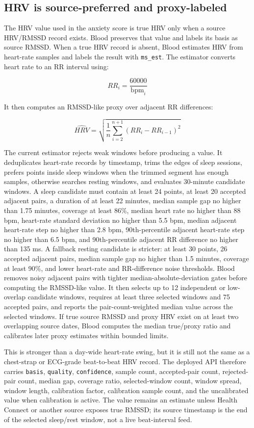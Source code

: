 \documentclass[12pt,letterpaper]{article}
\begin{document}
\subsection{HRV is source-preferred and proxy-labeled}

The HRV value used in the anxiety score is true HRV only when a source HRV/RMSSD record exists. Blood preserves that value and labels its basis as source RMSSD. When a true HRV record is absent, Blood estimates HRV from heart-rate samples and labels the result with \texttt{ms\_est}. The estimator converts heart rate to an RR interval using:

\[
RR_i = \frac{60000}{\mathrm{bpm}_i}
\]

It then computes an RMSSD-like proxy over adjacent RR differences:

\[
\widehat{HRV} = \sqrt{\frac{1}{n}\sum_{i=2}^{n+1}\left(RR_i - RR_{i-1}\right)^2}
\]

The current estimator rejects weak windows before producing a value. It deduplicates heart-rate records by timestamp, trims the edges of sleep sessions, prefers points inside sleep windows when the trimmed segment has enough samples, otherwise searches resting windows, and evaluates 30-minute candidate windows. A sleep candidate must contain at least 24 points, at least 20 accepted adjacent pairs, a duration of at least 22 minutes, median sample gap no higher than 1.75 minutes, coverage at least 86\%, median heart rate no higher than 88 bpm, heart-rate standard deviation no higher than 5.5 bpm, median adjacent heart-rate step no higher than 2.8 bpm, 90th-percentile adjacent heart-rate step no higher than 6.5 bpm, and 90th-percentile adjacent RR difference no higher than 135 ms. A fallback resting candidate is stricter: at least 30 points, 26 accepted adjacent pairs, median sample gap no higher than 1.5 minutes, coverage at least 90\%, and lower heart-rate and RR-difference noise thresholds. Blood removes noisy adjacent pairs with tighter median-absolute-deviation gates before computing the RMSSD-like value. It then selects up to 12 independent or low-overlap candidate windows, requires at least three selected windows and 75 accepted pairs, and reports the pair-count-weighted median value across the selected windows. If true source RMSSD and proxy HRV exist on at least two overlapping source dates, Blood computes the median true/proxy ratio and calibrates later proxy estimates within bounded limits.

This is stronger than a day-wide heart-rate swing, but it is still not the same as a chest-strap or ECG-grade beat-to-beat HRV record. The deployed API therefore carries \texttt{basis}, \texttt{quality}, \texttt{confidence}, sample count, accepted-pair count, rejected-pair count, median gap, coverage ratio, selected-window count, window spread, window length, calibration factor, calibration sample count, and the uncalibrated value when calibration is active. The value remains an estimate unless Health Connect or another source exposes true RMSSD; its source timestamp is the end of the selected sleep/rest window, not a live beat-interval feed.
\end{document}
